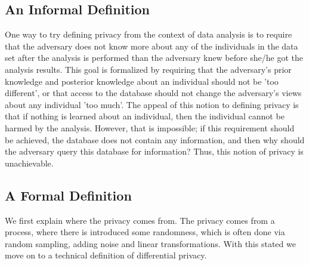 \documentclass[11pt]{article}
\theoremstyle{definition}
\begin{document}
\subsection{An Informal Definition}
One way to try defining privacy from the context of data analysis is to require that the adversary does not know more about any of the individuals in the data set after the analysis is performed than the adversary knew before she/he got the analysis results. This goal is formalized by requiring that the adversary's prior knowledge and posterior knowledge about an individual should not be 'too different', or that access to the database should not change the adversary's views about any individual 'too much'.
The appeal of this notion to defining privacy is that if nothing is learned about an individual, then the individual cannot be harmed by the analysis. However, that is impossible; if this requirement should be achieved, the database does not contain any information, and then why should the adversary query this database for information? Thus, this notion of privacy is unachievable.


\subsection{A Formal Definition}
We first explain where the privacy comes from. The privacy comes from a process, where there is introduced some randomness, which is often done via random sampling, adding noise and linear transformations. With this stated we move on to a technical definition of differential privacy.
\end{document}
